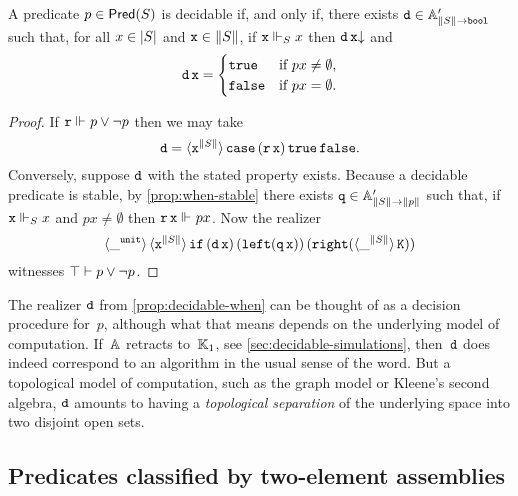 \begin{proposition}
  \label{prop:decidable-when}
  A predicate $p \in \Pred{S}$ is decidable if, and only if, there exists
  $\R{d} \in \subAtyp{\T{S} \to \ttbool}$ such that, for all $x \in \S{S}$ and $\R{x} \in \T{S}$, if $\R{x} \rz[S] x$ then $\defined{\R{d}\,\R{x}}$ and
  \begin{equation*}
    \R{d}\,\R{x} =
    \begin{cases}
      \combTrue & \text{if $p x \neq \emptyset$,} \\
      \combFalse & \text{if $p x = \emptyset$.}
    \end{cases}
  \end{equation*}
\end{proposition}

\begin{proof}
  If $\R{r} \rz p \lor \lnot p$ then we may take
  \begin{equation*}
    \R{d} = \tpcalam{\R{x}}{\T{S}} \combCase\,(\R{r}\,\R{x})\,\combTrue\,\combFalse.
  \end{equation*}
  Conversely, suppose $\R{d}$ with the stated property exists. Because a decidable predicate is stable, by \cref{prop:when-stable} there exists $\R{q} \in \subAtyp{\T{S} \to \T{p}}$ such that, if $\R{x} \rz[S] x$ and $p x \neq \emptyset$ then $\R{r}\,\R{x} \rz p x$. Now the realizer
  \begin{equation*}
    \tpcalam{\_}{\unit}
    \tpcalam{\R{x}}{\T{S}}
      \combIf\,
        (\R{d}\,\R{x})\,
        (\combLeft (\R{q}\,\R{x}))\,
        (\combRight (\tpcalam{\_}{\T{S}}{\combK}))
  \end{equation*}
  witnesses $\top \entails p \lor \lnot p$.
\end{proof}

The realizer $\R{d}$ from \cref{prop:decidable-when} can be thought of as a decision procedure for~$p$, although what that means depends on the underlying model of computation. If~$\AA$ retracts to~$\klone$, see \cref{sec:decidable-simulations}, then~$\R{d}$ does indeed correspond to an algorithm in the usual sense of the word. But a topological model of computation, such as the graph model or Kleene's second algebra, $\R{d}$ amounts to having a \emph{topological separation} of the underlying space into two disjoint open sets.


\subsection{Predicates classified by two-element assemblies}
\label{sec:predicates-classified}

